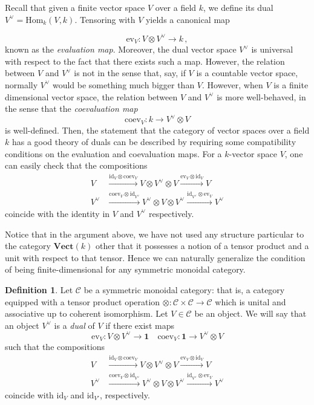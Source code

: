 \documentclass[a4paper,11pt]{article}
\newcommand{\Hom}{\mathrm{Hom}}
\newcommand{\ccal}{\mathcal{C}}
\newcommand{\vecto}{\mathbf{Vect}}
\newcommand{\ide}{\mathrm{id}}
\theoremstyle{plain}
\theoremstyle{definition}
\newtheorem{defi}[thm]{Definition}
\theoremstyle{remark}
\begin{document}
Recall that given a finite vector space $V$ over a field $k$, we define its dual $V^{\lor} = \Hom_k(V, k)$. Tensoring with $V$ yields a canonical map

$$\text{ev}_V \colon V \otimes V^{\lor} \to k \,,$$
known as the \textit{evaluation map}. Moreover, the dual vector space $V^{\lor}$ is universal with respect to the fact that there exists such a map. However, the relation between $V$ and $V^{\lor}$ is not  in the sense that, say, if $V$ is a countable vector space, normally $V^{\lor}$ would be something much bigger than $V$. However, when $V$ is a finite dimensional vector space, the relation between $V$ and $V^{\lor}$ is more well-behaved, in the sense that the \textit{coevaluation map}
$$\text{coev}_V \colon k \to V^{\lor} \otimes V$$
is well-defined. Then, the statement that the category of vector spaces over a field $k$ has a good theory of duals can be described by requiring some compatibility conditions on the evaluation and coevaluation maps. For a $k$-vector space $V$, one can easily check that the compositions 
\begin{align*}
    V &\xrightarrow{\ide_V \otimes \text{coev}_V} V \otimes V^{\lor} \otimes V \xrightarrow{\text{ev}_V \otimes \ide_V} V\\
    V^{\lor} & \xrightarrow{\text{coev}_V \otimes \ide_{V^{\lor}}} V^{\lor} \otimes V \otimes V^{\lor} \xrightarrow{\ide_{V^{\lor}} \otimes \text{ev}_V} V^{\lor}
\end{align*}
coincide with the identity in $V$ and $V^{\lor}$ respectively. 


Notice that in the argument above, we have not used any structure particular to the category $\vecto(k)$ other that it possesses a notion of a tensor product and a unit with respect to that tensor. Hence we can naturally generalize the condition of being finite-dimensional for any symmetric monoidal category. 

\begin{defi}
Let $\ccal$ be a symmetric monoidal category: that is, a category equipped with a tensor product operation $\otimes \colon \ccal \times \ccal \to \ccal$ which is unital and associative up to coherent isomorphism. Let $V\in \ccal$ be an object. We will say that an object $V^{\lor}$ is a \textit{dual} of $V$ if there exist maps 
$$\text{ev}_V \colon V \otimes V^{\lor} \to \mathbf{1} \quad \text{coev}_V \colon \mathbf{1} \to V^{\lor} \otimes V$$
such that the compositions 
\begin{align*}
    V &\xrightarrow{\ide_V \otimes \text{coev}_V} V \otimes V^{\lor} \otimes V \xrightarrow{\text{ev}_V \otimes \ide_V} V\\
    V^{\lor} & \xrightarrow{\text{coev}_V \otimes \ide_{V^{\lor}}} V^{\lor} \otimes V \otimes V^{\lor} \xrightarrow{\ide_{V^{\lor}} \otimes \text{ev}_V} V^{\lor}
\end{align*}
coincide with $\ide_V$ and $\ide_{V'}$, respectively. 
\end{defi}
\end{document}

